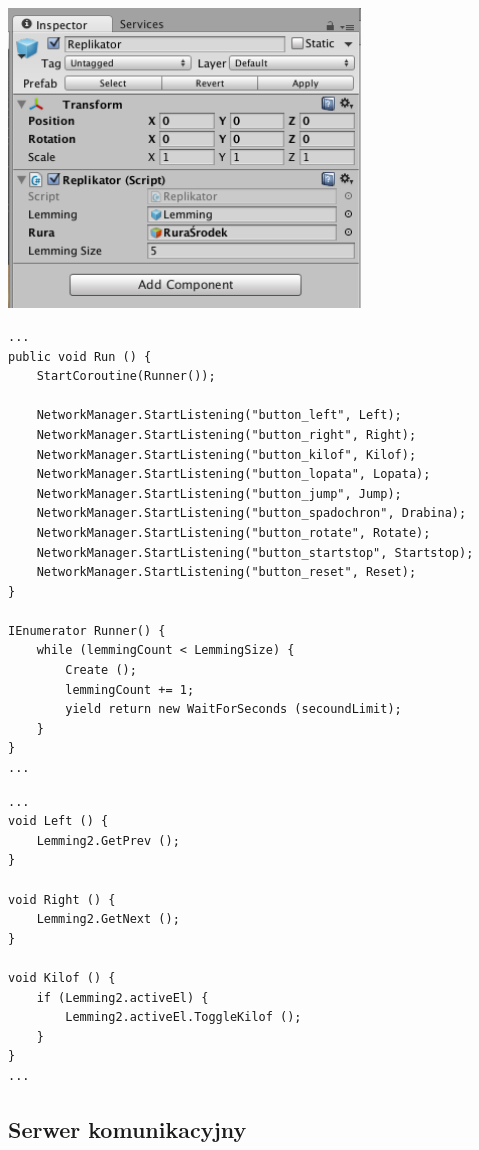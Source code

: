 \begin{center}
\includegraphics[width=0.7\textwidth]{images/replikator.png}
\end{center}

\begin{lstlisting}[language=CSharp]
...
public void Run () {
	StartCoroutine(Runner());

	NetworkManager.StartListening("button_left", Left);
	NetworkManager.StartListening("button_right", Right);
	NetworkManager.StartListening("button_kilof", Kilof);
	NetworkManager.StartListening("button_lopata", Lopata);
	NetworkManager.StartListening("button_jump", Jump);
	NetworkManager.StartListening("button_spadochron", Drabina);
	NetworkManager.StartListening("button_rotate", Rotate);
	NetworkManager.StartListening("button_startstop", Startstop);
	NetworkManager.StartListening("button_reset", Reset);
}

IEnumerator Runner() {
	while (lemmingCount < LemmingSize) {
		Create ();
		lemmingCount += 1;
		yield return new WaitForSeconds (secoundLimit);
	}
}
...
\end{lstlisting}

\begin{lstlisting}[language=CSharp]
...
void Left () {
	Lemming2.GetPrev ();
}

void Right () {
	Lemming2.GetNext ();
}

void Kilof () {
	if (Lemming2.activeEl) {
		Lemming2.activeEl.ToggleKilof ();
	}
}
...
\end{lstlisting}

\subsection{Serwer komunikacyjny}
